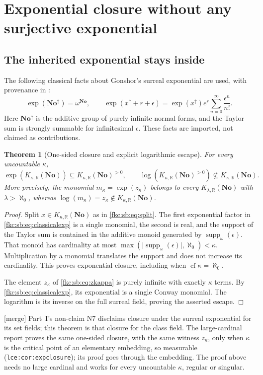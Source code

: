 \documentclass[11pt,letterpaper]{article}
\numberwithin{equation}{section}
\newtheorem{theorem}{Theorem}[section]
\theoremstyle{definition}
\theoremstyle{remark}
\newcommand{\R}{\mathbb R}
\newcommand{\No}{\mathbf{No}}
\newcommand{\cf}{\operatorname{cf}}
\newcommand{\mergetag}{\textup{\textsf{\small[merge]}}}%
\newcommand{\suppw}{\operatorname{supp}_{\omega}}
\newcommand{\card}[1]{\lvert #1\rvert}
\newcommand{\KN}[2]{K_{#1,#2}(\No)}%
\newcommand{\lbl}[1]{\nolinkurl{#1}}%
\begin{document}
\section{Exponential closure without any surjective exponential}\label{fkc:sb:sec:exponential}

\subsection{The inherited exponential stays inside}
The following classical facts about Gonshor's surreal exponential are used, with provenance in \cite[Theorem~2.16 and Section~2.3]{MM}:
\begin{equation}\label{fkc:sb:eq:classicalexp}
 \exp(\No^\uparrow)=\omega^{\No},\qquad
 \exp(x^\uparrow+r+\epsilon)
   =\exp(x^\uparrow)e^r\sum_{n=0}^{\infty}\frac{\epsilon^n}{n!}.
\end{equation}
Here $\No^\uparrow$ is the additive group of purely infinite normal forms, and the Taylor sum is strongly summable for infinitesimal $\epsilon$. These facts are imported, not claimed as contributions.

\begin{theorem}[One-sided closure and explicit logarithmic escape]\label{fkc:sb:thm:expclosure}
For every uncountable $\kappa$,
\[
 \exp(\KN\kappa\R)\subseteq\KN\kappa\R^{>0},\qquad
 \log(\KN\kappa\R^{>0})\nsubseteq\KN\kappa\R.
\]
More precisely, the monomial $m_\kappa=\exp(z_\kappa)$ belongs to every $\KN\lambda\R$ with $\lambda>\aleph_0$, whereas $\log(m_\kappa)=z_\kappa\notin\KN\kappa\R$.
\end{theorem}
\begin{proof}
Split $x\in\KN\kappa\R$ as in \eqref{fkc:sb:eq:split}. The first exponential factor in \eqref{fkc:sb:eq:classicalexp} is a single monomial, the second is real, and the support of the Taylor sum is contained in the additive monoid generated by $\suppw(\epsilon)$. That monoid has cardinality at most $\max(\card{\suppw(\epsilon)},\aleph_0)<\kappa$. Multiplication by a monomial translates the support and does not increase its cardinality. This proves exponential closure, including when $\cf\kappa=\aleph_0$.

The element $z_\kappa$ of \eqref{fkc:sb:eq:zkappa} is purely infinite with exactly $\kappa$ terms. By \eqref{fkc:sb:eq:classicalexp}, its exponential is a single Conway monomial. The logarithm is its inverse on the full surreal field, proving the asserted escape.
\end{proof}
\mergetag{} Part~I's non-claim N7 disclaims closure under the surreal exponential for its set fields; this theorem is that closure for the class field. The large-cardinal report proves the same one-sided closure, with the same witness $z_\kappa$, only when $\kappa$ is the critical point of an elementary embedding, so measurable (\lbl{lce:cor:expclosure}); its proof goes through the embedding. The proof above needs no large cardinal and works for every uncountable $\kappa$, regular or singular.
\end{document}
